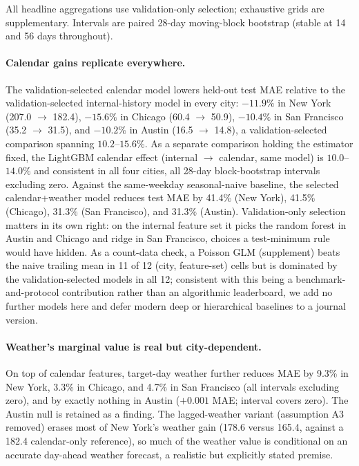 All headline aggregations use validation-only selection; exhaustive grids
are supplementary. Intervals are paired 28-day moving-block bootstrap
(stable at 14 and 56 days throughout).

\paragraph{Calendar gains replicate everywhere.}
The validation-selected calendar model lowers held-out test MAE relative
to the validation-selected internal-history model in every city:
$-11.9\%$ in New York (207.0 $\rightarrow$ 182.4), $-15.6\%$ in Chicago
(60.4 $\rightarrow$ 50.9), $-10.4\%$ in San Francisco (35.2 $\rightarrow$
31.5), and $-10.2\%$ in Austin (16.5 $\rightarrow$ 14.8), a
validation-selected comparison spanning $10.2$--$15.6\%$. As a separate
comparison holding the estimator fixed, the LightGBM calendar effect
(internal $\rightarrow$ calendar, same model) is $10.0$--$14.0\%$ and
consistent in all four cities, all 28-day block-bootstrap intervals
excluding zero. Against the same-weekday seasonal-naive baseline, the selected
calendar+weather model reduces test MAE by 41.4\% (New York), 41.5\%
(Chicago), 31.3\% (San Francisco), and 31.3\% (Austin). Validation-only
selection matters in its own right: on the internal feature set it picks
the random forest in Austin and Chicago and ridge in San Francisco,
choices a test-minimum rule would have hidden. As a count-data check, a
Poisson GLM (supplement) beats the naive trailing mean in 11 of 12 (city,
feature-set) cells but is dominated by the validation-selected models in
all 12; consistent with this being a benchmark-and-protocol contribution
rather than an algorithmic leaderboard, we add no further models here and
defer modern deep or hierarchical baselines to a journal version.

\paragraph{Weather's marginal value is real but city-dependent.}
On top of calendar features, target-day weather further reduces MAE by
9.3\% in New York, 3.3\% in Chicago, and 4.7\% in San Francisco (all
intervals excluding zero), and by exactly nothing in Austin ($+0.001$
MAE; interval covers zero). The Austin null is retained as a finding.
The lagged-weather variant (assumption A3 removed) erases most of New
York's weather gain (178.6 versus 165.4, against a 182.4 calendar-only
reference), so much of the weather value is conditional on an accurate
day-ahead weather forecast, a realistic but explicitly stated premise.

